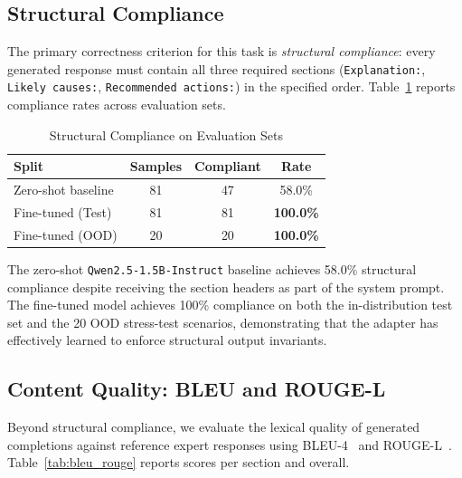 \documentclass[conference]{IEEEtran}
\begin{document}
\subsection{Structural Compliance}

The primary correctness criterion for this task is \textit{structural compliance}: every generated response must contain all three required sections (\texttt{Explanation:}, \texttt{Likely causes:}, \texttt{Recommended actions:}) in the specified order. Table~\ref{tab:compliance} reports compliance rates across evaluation sets.

\begin{table}[htbp]
\centering
\caption{Structural Compliance on Evaluation Sets}
\label{tab:compliance}
\begin{tabular}{lccc}
\toprule
\textbf{Split} & \textbf{Samples} & \textbf{Compliant} & \textbf{Rate} \\
\midrule
Zero-shot baseline & 81 & 47 & 58.0\% \\
Fine-tuned (Test)  & 81 & 81 & \textbf{100.0\%} \\
Fine-tuned (OOD)   & 20 & 20 & \textbf{100.0\%} \\
\bottomrule
\end{tabular}
\end{table}

The zero-shot \texttt{Qwen2.5-1.5B-Instruct} baseline achieves 58.0\% structural compliance despite receiving the section headers as part of the system prompt. The fine-tuned model achieves 100\% compliance on both the in-distribution test set and the 20 OOD stress-test scenarios, demonstrating that the adapter has effectively learned to enforce structural output invariants.

\subsection{Content Quality: BLEU and ROUGE-L}

Beyond structural compliance, we evaluate the lexical quality of generated completions against reference expert responses using BLEU-4~\cite{papineni2002bleu} and ROUGE-L~\cite{lin2004rouge}. Table~\ref{tab:bleu_rouge} reports scores per section and overall.
\end{document}
